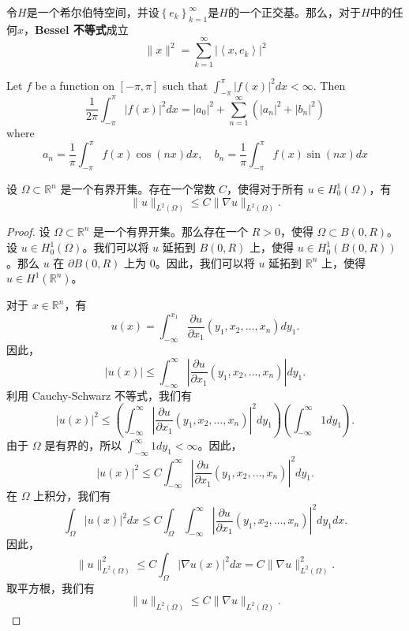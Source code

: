 \begin{definition}
令$H$是一个希尔伯特空间，并设$\left\{e_{k}\right\}_{k=1}^{\infty}$是$H$的一个正交基。那么，对于$H$中的任何$x$，\textbf{Bessel 不等式}成立
\[
\|x\|^{2}=\sum_{k=1}^{\infty}\left|\left\langle x, e_{k}\right\rangle\right|^{2}
\]
\end{definition}
\begin{definition}
Let $f$ be a function on $[-\pi, \pi]$ such that $\int_{-\pi}^\pi |f(x)|^2 dx < \infty$. Then
\[
\frac{1}{2 \pi} \int_{-\pi}^\pi |f(x)|^2 dx = |a_0|^2 + \sum_{n=1}^\infty (|a_n|^2 + |b_n|^2)
\]where
\[
a_n = \frac{1}{\pi} \int_{-\pi}^\pi f(x) \cos(nx) dx, \quad b_n = \frac{1}{\pi} \int_{-\pi}^\pi f(x) \sin(nx) dx
\]
\end{definition}
\begin{theorem}
设 $\Omega \subset \mathbb{R}^n$ 是一个有界开集。存在一个常数 $C$，使得对于所有 $u \in H_0^1(\Omega)$，有
\[
\|u\|_{L^2(\Omega)} \leq C\|\nabla u\|_{L^2(\Omega)}.
\]
\end{theorem}
\begin{proof}
设 $\Omega \subset \mathbb{R}^n$ 是一个有界开集。那么存在一个 $R > 0$，使得 $\Omega \subset B(0, R)$。设 $u \in H_0^1(\Omega)$。我们可以将 $u$ 延拓到 $B(0, R)$ 上，使得 $u \in H_0^1(B(0, R))$。那么 $u$ 在 $\partial B(0, R)$ 上为 0。因此，我们可以将 $u$ 延拓到 $\mathbb{R}^n$ 上，使得 $u \in H^1(\mathbb{R}^n)$。

对于 $x \in \mathbb{R}^n$，有
\[
u(x) = \int_{-\infty}^{x_1} \frac{\partial u}{\partial x_1}(y_1, x_2, \ldots, x_n) dy_1.
\]
因此，
\[
|u(x)| \leq \int_{-\infty}^{\infty} \left|\frac{\partial u}{\partial x_1}(y_1, x_2, \ldots, x_n)\right| dy_1.
\]
利用 Cauchy-Schwarz 不等式，我们有
\[
|u(x)|^2 \leq \left(\int_{-\infty}^{\infty} \left|\frac{\partial u}{\partial x_1}(y_1, x_2, \ldots, x_n)\right|^2 dy_1\right) \left(\int_{-\infty}^{\infty} 1 dy_1\right).
\]
由于 $\Omega$ 是有界的，所以 $\int_{-\infty}^{\infty} 1 dy_1 < \infty$。因此，
\[
|u(x)|^2 \leq C \int_{-\infty}^{\infty} \left|\frac{\partial u}{\partial x_1}(y_1, x_2, \ldots, x_n)\right|^2 dy_1.
\]
在 $\Omega$ 上积分，我们有
\[
\int_{\Omega} |u(x)|^2 dx \leq C \int_{\Omega} \int_{-\infty}^{\infty} \left|\frac{\partial u}{\partial x_1}(y_1, x_2, \ldots, x_n)\right|^2 dy_1 dx.
\]
因此，
\[
\|u\|_{L^2(\Omega)}^2 \leq C \int_{\Omega} |\nabla u(x)|^2 dx = C \|\nabla u\|_{L^2(\Omega)}^2.
\]
取平方根，我们有
\[
\|u\|_{L^2(\Omega)} \leq C \|\nabla u\|_{L^2(\Omega)}.
\]
\end{proof}

